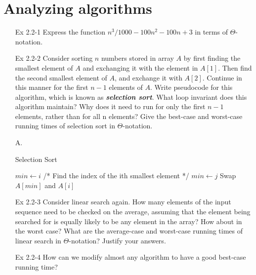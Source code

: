 \documentclass[fontsize=12pt,paper=a4]{book}
\newcommand{\To}{\ \textbf{to}\ }
\newcommand{\Lcomment}[1]{\Statex /* #1 */}
\begin{document}
\section{Analyzing algorithms}
\begin{enumerate}
 \item[Ex 2.2-1]
       Express the function $n^3/1000 - 100n^2 -100n + 3$ in terms of $\Theta$-notation.
       
 \item[Ex 2.2-2]
       Consider sorting $n$ numbers stored in array $A$ by first finding the smallest element of $A$ and exchanging it with the element in $A[1]$. Then find the second smallest element of $A$, and exchange it with $A[2]$. Continue in this manner for the first $n-1$ elements of $A$. Write pseudocode for this algorithm, which is known as \textbf{\textit{selection sort}}. What loop invariant does this algorithm maintain? Why does it need to run for only the first $n-1$ elements, rather than for all n elements? Give the best-case and worst-case running times of selection sort in $\Theta$-notation.
 \item[A.]
       \begin{algorithm}
        \caption{Selection Sort}
        \begin{algorithmic}[1]
         \For{$i \gets 0 \To n-1$}
         \State $min \gets i$
         \For{$j \gets i+1 \To n$}
         \Lcomment{Find the index of the ith smallest element}
         \State $min \gets j$
         \EndIf
         \EndFor
         \EndFor
         \State Swap $A[min]$ and $A[i]$
         \EndProcedure
        \end{algorithmic}
       \end{algorithm}
       
 \item[Ex 2.2-3]
       Consider linear search again. How many elements of the input sequence need to be checked on the average, assuming that the element being searched for is equally likely to be any element in the array? How about in the worst case? What are the average-case and worst-case running times of linear search in $\Theta$-notation? Justify your answers.
       
 \item[Ex 2.2-4]
       How can we modify almost any algorithm to have a good best-case running time?
       
\end{enumerate}
\end{document}
